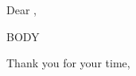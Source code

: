 \documentclass[11pt]{letter}
\begin{document}
\begin{letter}{%
}

\opening{Dear ,}

BODY

\closing{Thank you for your time,}

\end{letter}
\end{document}
